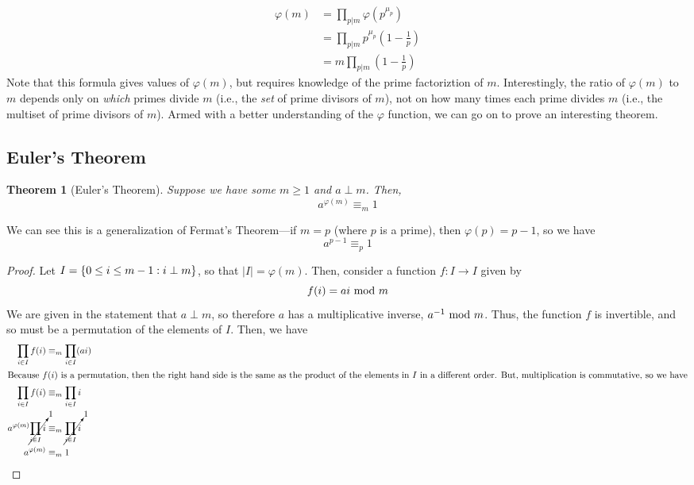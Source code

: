 \documentclass[10pt]{article}
\renewcommand\mod{{\textnormal{~mod~}}}
\newtheorem{theorem}{Theorem}[section]
\theoremstyle{definition}
\begin{document}
\begin{align*}
\varphi(m) &= \prod_{p|m} \varphi(p^{\mu_p}) \\ 
&= \prod_{p|m} p^{\mu_p} \left(1-\frac{1}{p}\right) \\ 
&= m\prod_{p|m} \left(1-\frac{1}{p}\right)
\end{align*}
Note that this formula gives values of $\varphi(m)$, but requires knowledge of the prime factoriztion of $m$.  Interestingly, the ratio of $\varphi(m)$ to $m$ depends only on \textit{which} primes divide $m$ (i.e., the \textit{set} of prime divisors of $m$), not on how many times each prime divides $m$ (i.e., the multiset of prime divisors of $m$).  Armed with a better understanding of the $\varphi$ function, we can go on to prove an interesting theorem.  
\subsection{Euler's Theorem}
\begin{theorem}[Euler's Theorem]
Suppose we have some $m\geq 1$ and $a\perp m$.  Then, 
\[a^{\varphi(m)} \equiv_m 1 \] 
\end{theorem}
We can see this is a generalization of Fermat's Theorem---if $m=p$ (where $p$ is a prime), then $\varphi(p) = p-1$, so we have 
\[a^{p-1} \equiv_p 1 \] 
\begin{proof}
Let $I=\{ 0\leq i \leq m-1: i \perp m \}$, so that $|I|=\varphi(m)$.  Then, consider a function $f:I \rightarrow I$ given by \[f(i) = ai \mod m\]
We are given in the statement that $a\perp m$, so therefore $a$ has a multiplicative inverse, $a^{-1} \mod m$.  Thus, the function $f$ is invertible, and so must be a permutation of the elements of $I$.  Then, we have 
\begin{align*}
\prod_{i\in I} f(i) &\equiv_m \prod_{i\in I}(ai) \\ 
\shortintertext{Because $f(i)$ is a permutation, then the right hand side is the same as the product of the elements in $I$ in a different order.  But, multiplication is commutative, so we have}
\prod_{i\in I} f(i)&\equiv_m \prod_{i\in I}i \\  
a^{\varphi(m)} \cancelto{1}{\prod_{i\in I} i} &\equiv_m \cancelto{1}{\prod_{i\in I} i} \\ 
a^{\varphi(m)} &\equiv_m 1
\end{align*}
\end{proof}
\end{document}
